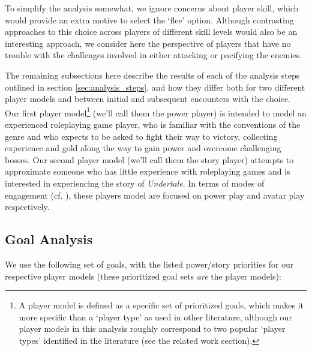 \documentclass[arts,article,submit,moreauthors,pdftex,10pt,a4paper]{Definitions/mdpi}
\begin{document}
To simplify the analysis somewhat, we ignore concerns about player skill, which would provide an extra motive to select the `flee' option.
%
Although contrasting approaches to this choice across players of different skill levels would also be an interesting approach, we consider here the perspective of players that have no trouble with the challenges involved in either attacking or pacifying the enemies.


The remaining subsections here describe the results of each of the analysis steps outlined in section \ref{sec:analysis_steps}, and how they differ both for two different player models and between initial and subsequent encounters with the choice.
%
Our first player model\footnote{A player model is defined as a specific set of prioritized goals, which makes it more specific than a `player type' as used in other literature, although our player models in this analysis roughly correspond to two popular `player types' identified in the literature (see the related work section).} (we'll call them the power player) is intended to model an experienced roleplaying game player, who is familiar with the conventions of the genre and who expects to be asked to fight their way to victory, collecting experience and gold along the way to gain power and overcome challenging bosses.
%
Our second player model (we'll call them the story player) attempts to approximate someone who has little experience with roleplaying games and is interested in experiencing the story of \emph{Undertale}.
%
In terms of modes of engagement (cf. \cite{mawhorter2014towards}), these players model are focused on power play and avatar play respectively.

\subsection{Goal Analysis}

We use the following set of goals, with the listed power/story priorities for our respective player models (these prioritized goal sets \emph{are} the player models):
\end{document}
